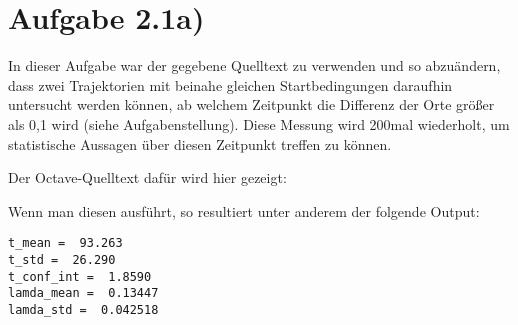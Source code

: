 \section*{Aufgabe 2.1a)}
In dieser Aufgabe war der gegebene Quelltext zu verwenden und so abzuändern, 
dass zwei Trajektorien mit beinahe gleichen Startbedingungen daraufhin
untersucht werden können, ab welchem Zeitpunkt die Differenz der Orte größer als
0,1 wird (siehe Aufgabenstellung). Diese Messung wird 200mal wiederholt, um
statistische Aussagen über diesen Zeitpunkt treffen zu können.

Der Octave-Quelltext dafür wird hier gezeigt:


Wenn man diesen ausführt, so resultiert unter anderem der folgende Output:
\begin{lstlisting}[caption=Output unseres Programms,label=lst:output]
t_mean =  93.263
t_std =  26.290
t_conf_int =  1.8590
lamda_mean =  0.13447
lamda_std =  0.042518
\end{lstlisting}